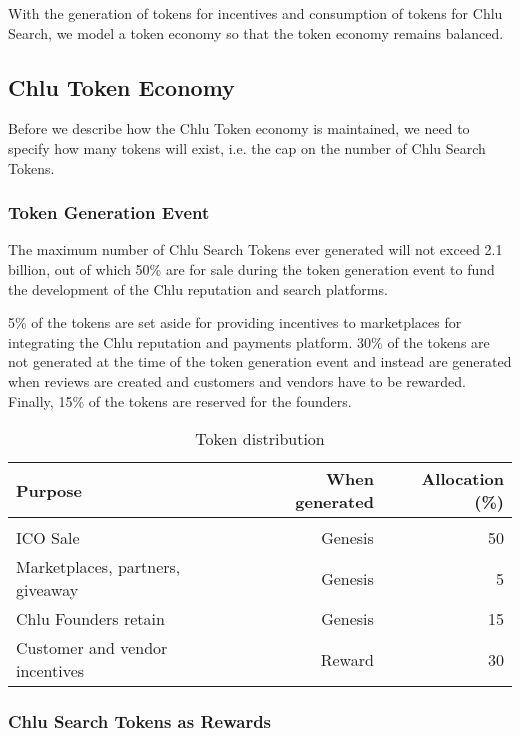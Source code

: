 \documentclass[a4paper]{article}
\begin{document}
With the generation of tokens for incentives and consumption of tokens
for Chlu Search, we model a token economy so that the token economy
remains balanced.

\subsection{Chlu Token Economy}

Before we describe how the Chlu Token economy is maintained, we need
to specify how many tokens will exist, i.e. the cap on the number of
Chlu Search Tokens.

\subsubsection{Token Generation Event}

The maximum number of Chlu Search Tokens ever generated will not
exceed 2.1 billion, out of which 50\% are for sale during the token
generation event to fund the development of the Chlu reputation and
search platforms.

5\% of the tokens are set aside for providing incentives to
marketplaces for integrating the Chlu reputation and payments
platform. 30\% of the tokens are not generated at the time of the
token generation event and instead are generated when reviews are
created and customers and vendors have to be rewarded. Finally, 15\%
of the tokens are reserved for the founders.

\begin{center}
  \begin{table}
    \begin{tabular}{l r r}
      \textbf{Purpose} & \textbf{When generated} & \textbf{Allocation (\%)} \\
      \hline \\
      ICO Sale & Genesis & 50 \\
      Marketplaces, partners, giveaway  & Genesis & 5 \\
      Chlu Founders retain & Genesis & 15 \\
      Customer and vendor incentives & Reward & 30
    \end{tabular}
    \caption{Token distribution}
  \end{table}
\end{center}

\subsubsection{Chlu Search Tokens as Rewards}
\end{document}
